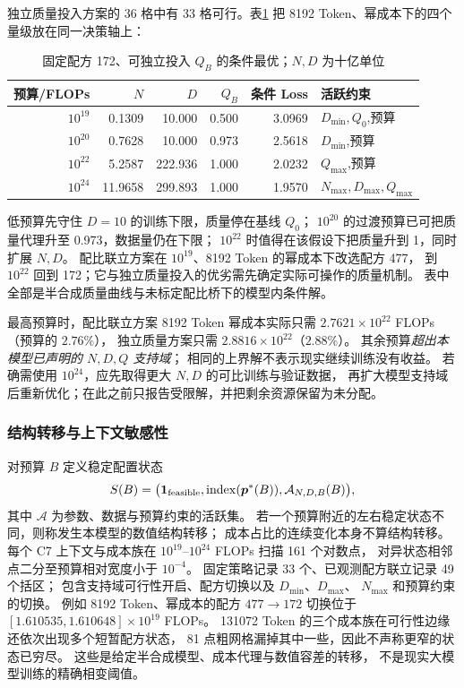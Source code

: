 独立质量投入方案的 36 格中有 33 格可行。表\ref{tab:q3_native_quality}
把 8192 Token、幂成本下的四个量级放在同一决策轴上：
\begin{table}[htbp]\centering\small
\caption{固定配方 172、可独立投入 $Q_B$ 的条件最优；$N,D$ 为十亿单位}
\label{tab:q3_native_quality}
\begin{tabular}{rrrrrl}\toprule
预算/FLOPs & $N$ & $D$ & $Q_B$ & 条件 Loss & 活跃约束\\\midrule
$10^{19}$ & 0.1309 & 10.000 & 0.500 & 3.0969 & $D_{\min},Q_0$,预算\\
$10^{20}$ & 0.7628 & 10.000 & 0.973 & 2.5618 & $D_{\min}$,预算\\
$10^{22}$ & 5.2587 & 222.936 & 1.000 & 2.0232 & $Q_{\max}$,预算\\
$10^{24}$ & 11.9658 & 299.893 & 1.000 & 1.9570 & $N_{\max},D_{\max},Q_{\max}$\\
\bottomrule\end{tabular}
\end{table}
低预算先守住 $D=10$ 的训练下限，质量停在基线 $Q_0$；
$10^{20}$ 的过渡预算已可把质量代理升至 0.973，数据量仍在下限；
$10^{22}$ 时值得在该假设下把质量升到 1，同时扩展 $N,D$。
配比联立方案在 $10^{19}$、8192 Token 的幂成本下改选配方 477，
到 $10^{22}$ 回到 172；它与独立质量投入的优劣需先确定实际可操作的质量机制。
表中全部是半合成质量曲线与未标定配比桥下的模型内条件解。

最高预算时，配比联立方案 8192 Token 幂成本实际只需
$2.7621\times10^{22}$ FLOPs（预算的 $2.76\%$），
独立质量方案只需 $2.8816\times10^{22}$（$2.88\%$）。
其余预算\emph{超出本模型已声明的 $N,D,Q$ 支持域}；
相同的上界解不表示现实继续训练没有收益。
若确需使用 $10^{24}$，应先取得更大 $N,D$ 的可比训练与验证数据，
再扩大模型支持域后重新优化；在此之前只报告受限解，并把剩余资源保留为未分配。

\subsubsection{结构转移与上下文敏感性}
对预算 $B$ 定义稳定配置状态
\begin{equation}
S(B)=\bigl(\mathbf 1_{\rm feasible},\operatorname{index}(\boldsymbol p^*(B)),
\mathcal A_{N,D,B}(B)\bigr),
\label{eq:q3_v8_state}
\end{equation}
其中 $\mathcal A$ 为参数、数据与预算约束的活跃集。
若一个预算附近的左右稳定状态不同，则称发生本模型的数值结构转移；
成本占比的连续变化本身不算结构转移。
每个 C7 上下文与成本族在 $10^{19}$--$10^{24}$ FLOPs 扫描 161 个对数点，
对异状态相邻点二分至预算相对宽度小于 $10^{-4}$。
固定策略记录 33 个、已观测配方联立记录 49 个括区；
包含支持域可行性开启、配方切换以及 $D_{\min}$、$D_{\max}$、
$N_{\max}$ 和预算约束的切换。
例如 8192 Token、幂成本的配方 $477\to172$ 切换位于
$[1.610535,1.610648]\times10^{19}$ FLOPs。
131072 Token 的三个成本族在可行性边缘还依次出现多个短暂配方状态，
81 点粗网格漏掉其中一些，因此不声称更窄的状态已穷尽。
这些是给定半合成模型、成本代理与数值容差的转移，
不是现实大模型训练的精确相变阈值。

